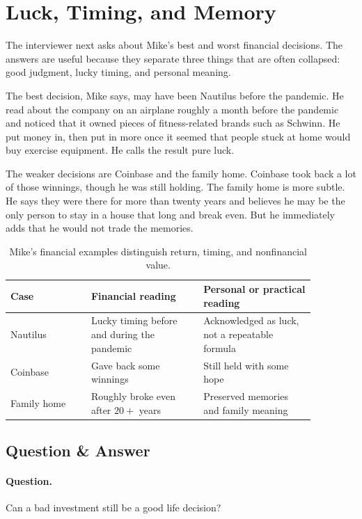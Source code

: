 \section{Luck, Timing, and Memory}

The interviewer next asks about Mike's best and worst financial decisions. The answers are useful because they separate three things that are often collapsed: good judgment, lucky timing, and personal meaning.

The best decision, Mike says, may have been Nautilus before the pandemic. He read about the company on an airplane roughly a month before the pandemic and noticed that it owned pieces of fitness-related brands such as Schwinn. He put money in, then put in more once it seemed that people stuck at home would buy exercise equipment. He calls the result pure luck.

The weaker decisions are Coinbase and the family home. Coinbase took back a lot of those winnings, though he was still holding. The family home is more subtle. He says they were there for more than twenty years and believes he may be the only person to stay in a house that long and break even. But he immediately adds that he would not trade the memories.

\begin{table}
\centering
\begin{tabular}{p{0.23\linewidth}p{0.32\linewidth}p{0.32\linewidth}}
\hline
Case & Financial reading & Personal or practical reading \\
\hline
Nautilus & Lucky timing before and during the pandemic & Acknowledged as luck, not a repeatable formula \\
Coinbase & Gave back some winnings & Still held with some hope \\
Family home & Roughly broke even after \(20+\) years & Preserved memories and family meaning \\
\hline
\end{tabular}
\caption{Mike's financial examples distinguish return, timing, and nonfinancial value.}
\end{table}

\subsection{Question \& Answer}

\paragraph{Question.}
Can a bad investment still be a good life decision?

